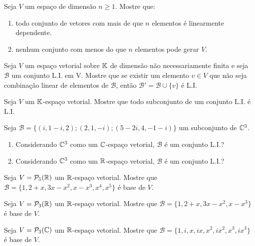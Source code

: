 \documentclass[12pt]{exam}
\begin{document}
\begin{exercicio}
  Seja $V$ um espa\c{c}o de dimens\~ao $n \ge 1$. Mostre que:
  \begin{enumerate}[label={\alph*})]
    \item todo conjunto de vetores com mais de que $n$ elementos \'e linearmente dependente.
    \item nenhum conjunto com menos do que $n$ elementos pode gerar $V$.
  \end{enumerate}
\end{exercicio}

\begin{exercicio}
  Seja $V$ um espa\c{c}o vetorial sobre $\mathbb{K}$ de dimens\~ao n\~ao necessariamente finita e seja $\mathcal{B}$ um conjunto L.I. em V. Mostre que se existir um elemento $v \in V$ que n\~ao seja combina\c{c}\~ao linear de elementos de $\mathcal{B}$, ent\~ao $\mathcal{B}' = \mathcal{B} \cup \{v\}$ \'e L.I.
\end{exercicio}

\begin{exercicio}
  Seja $V$ um $\mathbb{K}$-espa\c{c}o vetorial. Mostre que todo subconjunto de um conjunto L.I. \'e L.I.
\end{exercicio}

\begin{exercicio}
  Seja $\mathcal{B} = \{(i, 1-i, 2); (2,1,-i);(5-2i,4,-1-i)\}$ um subconjunto de $\mathbb{C}^3$.
  \begin{enumerate}[label={\alph*})]
    \item Considerando $\mathbb{C}^3$ como um $\mathbb{C}$-espa\c{c}o vetorial, $\mathcal{B}$ \'e um conjunto L.I.?
    \item Considerando $\mathbb{C}^3$ como um $\mathbb{R}$-espa\c{c}o vetorial, $\mathcal{B}$ \'e um conjunto L.I.?
  \end{enumerate}
\end{exercicio}

\begin{exercicio}
  Seja $V = \mathcal{P}_5(\mathbb{R})$ um $\mathbb{R}$-espa\c{c}o vetorial. Mostre que $\mathcal{B} = \{1, 2+x, 3x-x^2,x-x^3, x^4, x^5\}$ \'e base de $V$.
\end{exercicio}

\begin{exercicio}
  Seja $V = \mathcal{P}_3(\mathbb{R})$ um $\mathbb{R}$-espa\c{c}o vetorial. Mostre que $\mathcal{B} = \{1, 2+x, 3x-x^2,x-x^3\}$ \'e base de $V$.
\end{exercicio}

\begin{exercicio}
  Seja $V = \mathcal{P}_3(\mathbb{C})$ um $\mathbb{R}$-espa\c{c}o vetorial. Mostre que $\mathcal{B} = \{1, i, x, ix, x^2, ix^2, x^3, ix^3\}$ \'e base de $V$.
\end{exercicio}
\end{document}
